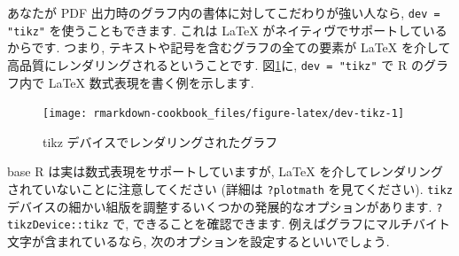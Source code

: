 \documentclass[
  11pt,
  lualatex,ja=standard,jafont=noto]{bxjsreport}
\newenvironment{Shaded}{\begin{snugshade}}{\end{snugshade}}
\newcommand{\AttributeTok}[1]{\textcolor[rgb]{0.77,0.63,0.00}{#1}}
\newcommand{\DecValTok}[1]{\textcolor[rgb]{0.00,0.00,0.81}{#1}}
\newcommand{\FunctionTok}[1]{\textcolor[rgb]{0.00,0.00,0.00}{#1}}
\newcommand{\NormalTok}[1]{#1}
\newcommand{\SpecialCharTok}[1]{\textcolor[rgb]{0.00,0.00,0.00}{#1}}
\newcommand{\StringTok}[1]{\textcolor[rgb]{0.31,0.60,0.02}{#1}}
\begin{document}
あなたが PDF 出力時のグラフ内の書体に対してこだわりが強い人なら, \texttt{dev = "tikz"} を使うこともできます. これは LaTeX がネイティヴでサポートしているからです. つまり, テキストや記号を含むグラフの全ての要素が LaTeX を介して高品質にレンダリングされるということです. 図\ref{fig:dev-tikz}に, \texttt{dev = "tikz"} で R のグラフ内で LaTeX 数式表現を書く例を示します.

\begin{Shaded}
\end{Shaded}

\begin{figure}

{\centering \texttt{[image: rmarkdown-cookbook\_files/figure-latex/dev-tikz-1]} 

}

\caption{tikz デバイスでレンダリングされたグラフ}\label{fig:dev-tikz}
\end{figure}

base R は実は数式表現をサポートしていますが, LaTeX を介してレンダリングされていないことに注意してください (詳細は \texttt{?plotmath} を見てください). \texttt{tikz} デバイスの細かい組版を調整するいくつかの発展的なオプションがあります. \texttt{?tikzDevice::tikz} で, できることを確認できます. 例えばグラフにマルチバイト文字が含まれているなら, 次のオプションを設定するといいでしょう.
\end{document}

